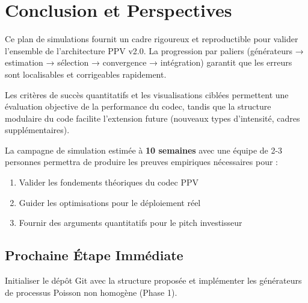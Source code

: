 \documentclass[12pt,a4paper]{article}
\begin{document}
	\section{Conclusion et Perspectives}
	\label{sec:conclusion}
	
	Ce plan de simulations fournit un cadre rigoureux et reproductible pour valider l'ensemble de l'architecture PPV v2.0. La progression par paliers (générateurs → estimation → sélection → convergence → intégration) garantit que les erreurs sont localisables et corrigeables rapidement.
	
	Les critères de succès quantitatifs et les visualisations ciblées permettent une évaluation objective de la performance du codec, tandis que la structure modulaire du code facilite l'extension future (nouveaux types d'intensité, cadres supplémentaires).
	
	La campagne de simulation estimée à \textbf{10 semaines} avec une équipe de 2-3 personnes permettra de produire les preuves empiriques nécessaires pour :
	\begin{enumerate}
		\item Valider les fondements théoriques du codec PPV
		\item Guider les optimisations pour le déploiement réel
		\item Fournir des arguments quantitatifs pour le pitch investisseur
	\end{enumerate}
	
	\subsection{Prochaine Étape Immédiate}
	\label{subsec:prochaine_etape}
	
	Initialiser le dépôt Git avec la structure proposée et implémenter les générateurs de processus Poisson non homogène (Phase 1).
	
	\newpage
	
	
	
\end{document}

